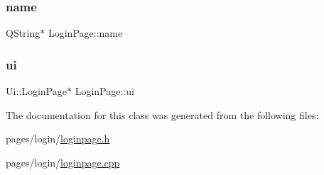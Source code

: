 \subsubsection{\texorpdfstring{name}{name}}
{\footnotesize\ttfamily Q\+String$\ast$ Login\+Page\+::name\hspace{0.3cm}{\ttfamily [private]}}

\mbox{\label{class_login_page_a427700feff04d4252d0b9d406740bcc5}} 
\subsubsection{\texorpdfstring{ui}{ui}}
{\footnotesize\ttfamily Ui\+::\+Login\+Page$\ast$ Login\+Page\+::ui\hspace{0.3cm}{\ttfamily [private]}}



The documentation for this class was generated from the following files\+:\begin{DoxyCompactItemize}
\item 
pages/login/\mbox{\hyperlink{loginpage_8h}{loginpage.\+h}}\item 
pages/login/\mbox{\hyperlink{loginpage_8cpp}{loginpage.\+cpp}}\end{DoxyCompactItemize}
